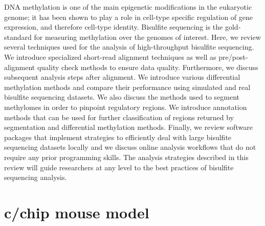 DNA methylation is one of the main epigenetic modifications in the eukaryotic genome; it has been shown to play a role in cell-type specific regulation of gene expression, and therefore cell-type identity. Bisulfite sequencing is the gold-standard for measuring methylation over the genomes of interest. Here, we review several techniques used for the analysis of high-throughput bisulfite sequencing. We introduce specialized short-read alignment techniques as well as pre/post-alignment quality check methods to ensure data quality. Furthermore, we discuss subsequent analysis steps after alignment. We introduce various differential methylation methods and compare their performance using simulated and real bisulfite sequencing datasets. We also discuss the methods used to segment methylomes in order to pinpoint regulatory regions. We introduce annotation methods that can be used for further classification of regions returned by segmentation and differential methylation methods. Finally, we review software packages that implement strategies to efficiently deal with large bisulfite sequencing datasets locally and we discuss online analysis workflows that do not require any prior programming skills. The analysis strategies described in this review will guide researchers at any level to the best practices of bisulfite sequencing analysis.\cite{Wreczycka2017}

\section{c/chip mouse model}
